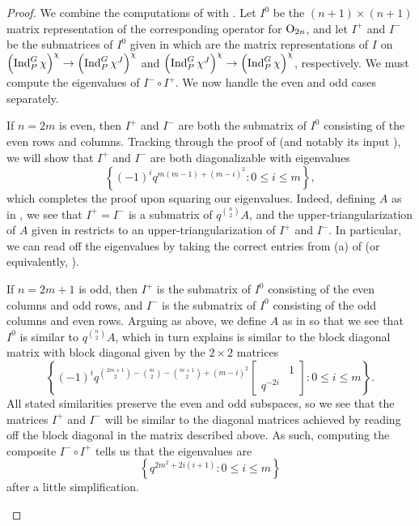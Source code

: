 \begin{proof}
    We combine the computations of  with . Let $I^0$ be the $(n+1)\times(n+1)$ matrix representation of the corresponding operator for $\mathrm{O}_{2n}$, and let $I^+$ and $I^-$ be the submatrices of $I^0$ given in  which are the matrix representations of $I$ on $\left(\operatorname{Ind}_P^G\chi\right)^\chi\to\left(\operatorname{Ind}_P^G\chi^J\right)^\chi$ and $\left(\operatorname{Ind}_P^G\chi^J\right)^\chi\to\left(\operatorname{Ind}_P^G\chi\right)^\chi$, respectively. We must compute the eigenvalues of $I^-\circ I^+$. We now handle the even and odd cases separately.
    \begin{listalph}
        \item If $n=2m$ is even, then $I^+$ and $I^-$ are both the submatrix of $I^0$ consisting of the even rows and columns. Tracking through the proof of  (and notably its input ), we will show that $I^+$ and $I^-$ are both diagonalizable with eigenvalues
        \[\left\{(-1)^{i}q^{m(m-1)+(m-i)^2}:0\le i\le m\right\},\]
        which completes the proof upon squaring our eigenvalues. Indeed, defining $A$ as in , we see that $I^+=I^-$ is a submatrix of $q^{\binom n2}A$, and the upper-triangularization of $A$ given in  restricts to an upper-triangularization of $I^+$ and $I^-$. In particular, we can read off the eigenvalues by taking the correct entries from (a) of  (or equivalently, ).
        \item If $n=2m+1$ is odd, then $I^+$ is the submatrix of $I^0$ consisting of the even columns and odd rows, and $I^-$ is the submatrix of $I^0$ consisting of the odd columns and even rows. Arguing as above, we define $A$ as in  so that we see that $I^0$ is similar to $q^{\binom{n}2}A$, which in turn  explains is similar to the block diagonal matrix with block diagonal given by the $2\times2$ matrices
        \[\left\{(-1)^iq^{\binom{2m+1}2-\binom{m}2-\binom{m+1}2+(m-i)^2}\begin{bmatrix}
            & 1 \\
            q^{-2i}
        \end{bmatrix}:0\le i\le m\right\}.\]
        All stated similarities preserve the even and odd subspaces, so we see that the matrices $I^+$ and $I^-$ will be similar to the diagonal matrices achieved by reading off the block diagonal in the matrix described above. As such, computing the composite $I^-\circ I^+$ tells us that the eigenvalues are
        \[\left\{q^{2m^2+2i(i+1)}:0\le i\le m\right\}\]
        after a little simplification.
        \qedhere
    \end{listalph}
\end{proof}

